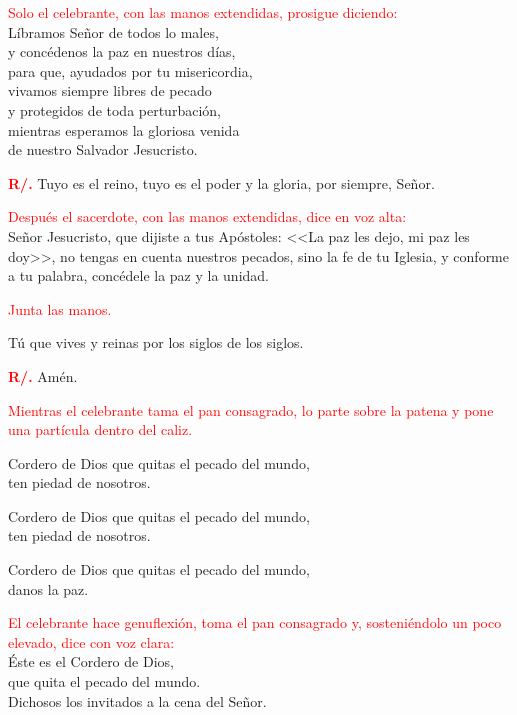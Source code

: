 \documentclass[12pt, letterpaper, spanish]{article}
\begin{document}
  \large{\textcolor{red}{Solo el celebrante, con las manos extendidas, prosigue diciendo:}}\\
  \Large L\'ibramos Se\~nor de todos lo males,\\ 
  y conc\'edenos la paz en nuestros d\'ias,\\ 
  para que, ayudados por tu misericordia,\\ 
  vivamos siempre libres de pecado\\ 
  y protegidos de toda perturbaci\'on,\\ 
  mientras esperamos la gloriosa venida\\ 
  de nuestro Salvador Jesucristo.

  \noindent
  \Large {\bfseries \textcolor{red}{R/.}} \hspace{0.5cm} Tuyo es el reino, tuyo es el poder y la gloria, por siempre, Se\~nor.

  \large{\textcolor{red}{Despu\'es el sacerdote, con las manos extendidas, dice en voz alta:}}\\
  \Large Se\~nor Jesucristo, que dijiste a tus Ap\'ostoles: <<La paz les dejo, mi paz les doy>>, no tengas en cuenta nuestros pecados, sino la fe de tu Iglesia, y conforme a tu palabra, conc\'edele la paz y la unidad.

  \large{\textcolor{red}{Junta las manos.}}

  \noindent
  \Large T\'u que vives y reinas por los siglos de los siglos.

  \noindent
  \Large {\bfseries \textcolor{red}{R/.}} \hspace{0.5cm} Am\'en.

  \large{\textcolor{red}{Mientras el celebrante tama el pan consagrado, lo parte sobre la patena y pone una part\'icula dentro del caliz.}}

  \noindent
  \Large Cordero de Dios que quitas el pecado del mundo,\\
  ten piedad de nosotros.

  \noindent
  \Large Cordero de Dios que quitas el pecado del mundo,\\ 
  ten piedad de nosotros.

  \noindent
  \Large Cordero de Dios que quitas el pecado del mundo,\\ 
  danos la paz.
  
  \large{\textcolor{red}{El celebrante hace genuflexi\'on, toma el pan consagrado y, sosteni\'endolo un poco elevado, dice con voz clara:}}\\
  \Large \'Este es el Cordero de Dios,\\ 
  que quita el pecado del mundo.\\ 
  Dichosos los invitados a la cena del Se\~nor.
\end{document}
